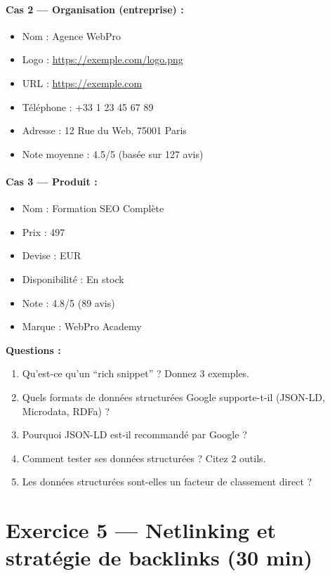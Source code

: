 \documentclass[12pt,a4paper]{report}
\begin{document}
\paragraph{Cas 2 --- Organisation (entreprise) :}
\begin{itemize}
    \item Nom : Agence WebPro
    \item Logo : \url{https://exemple.com/logo.png}
    \item URL : \url{https://exemple.com}
    \item T\'{e}l\'{e}phone : +33 1 23 45 67 89
    \item Adresse : 12 Rue du Web, 75001 Paris
    \item Note moyenne : 4.5/5 (bas\'{e}e sur 127 avis)
\end{itemize}

\paragraph{Cas 3 --- Produit :}
\begin{itemize}
    \item Nom : Formation SEO Compl\`{e}te
    \item Prix : 497\,\texteuro{}
    \item Devise : EUR
    \item Disponibilit\'{e} : En stock
    \item Note : 4.8/5 (89 avis)
    \item Marque : WebPro Academy
\end{itemize}

\textbf{Questions :}
\begin{enumerate}
    \item Qu'est-ce qu'un ``rich snippet'' ? Donnez 3 exemples.
    \item Quels formats de donn\'{e}es structur\'{e}es Google supporte-t-il (JSON-LD, Microdata, RDFa) ?
    \item Pourquoi JSON-LD est-il recommand\'{e} par Google ?
    \item Comment tester ses donn\'{e}es structur\'{e}es ? Citez 2 outils.
    \item Les donn\'{e}es structur\'{e}es sont-elles un facteur de classement direct ?
\end{enumerate}

\section{Exercice 5 --- Netlinking et strat\'{e}gie de backlinks (30 min)}
\end{document}
